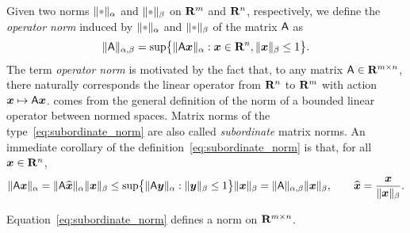 Given two norms $\norm{\placeholder}_{\alpha}$ and $\norm{\placeholder}_{\beta}$ on $\mathbf R^m$ and $\mathbf R^n$, respectively,
we define the \emph{operator norm} induced by $\norm{\placeholder}_{\alpha}$ and $\norm{\placeholder}_{\beta}$ of the matrix $\mathsf A$ as
\begin{equation}
    \label{eq:subordinate_norm}
    \lVert\mathsf A\rVert_{\alpha,\beta} = \sup \bigl\{ \lVert\mathsf A \mathbf{\boldsymbol{x}}\rVert_{\alpha} : \mathbf{\boldsymbol{x}} \in \mathbf R^n, \lVert\mathbf{\boldsymbol{x}}\rVert_{\beta} \leq 1 \bigr\}.
\end{equation}
The term \emph{operator norm} is motivated by the fact that,
to any matrix $\mathsf A \in \mathbf R^{m \times n}$, there naturally corresponds the linear operator from $\mathbf R^n$ to $\mathbf R^m$ with action~$\mathbf{\boldsymbol{x}} \mapsto \mathsf A \mathbf{\boldsymbol{x}}$.
 comes from the general definition of the norm of a bounded linear operator between normed spaces.
Matrix norms of the type~\eqref{eq:subordinate_norm} are also called \emph{subordinate} matrix norms.
An immediate corollary of the definition~\eqref{eq:subordinate_norm} is that,
for all $\mathbf{\boldsymbol{x}} \in \mathbf R^n$,
\begin{equation}
    \label{eq:submultiplicative_mat_vec}%
    \norm{\mat A \vect x}_{\alpha}
    = \norm{\mat A \widehat{\vect x}}_{\alpha} \norm{\vect x}_{\beta}
    \leq \sup \bigl\{ \norm{\mat A \vect y}_{\alpha}: \norm{\vect y}_{\beta} \leq 1 \bigr\} \norm{\vect x}_{\beta}
    = \norm{\mat A}_{\alpha,\beta} \norm{\vect x}_{\beta},
    \qquad \widehat {\vect x} = \frac{\vect x}{\norm{\vect x}_{\beta}}.
\end{equation}
\begin{proposition}
    Equation~\eqref{eq:subordinate_norm} defines a norm on $\mathbf R^{m \times n}$.
\end{proposition}
